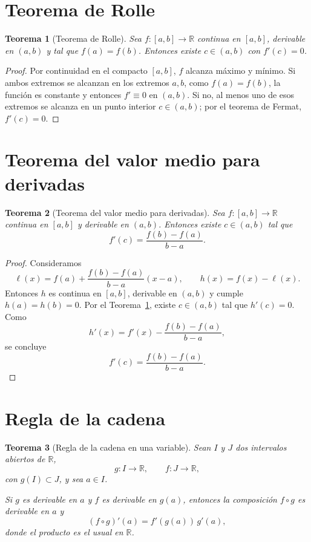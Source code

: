 \documentclass[a4paper,11pt]{report}
\newtheorem{theorem}{Teorema}[chapter]
\begin{document}
\section{Teorema de Rolle}

\begin{theorem}[Teorema de Rolle]\label{thm:rolle}
Sea $f:[a,b]\to\mathbb{R}$ continua en $[a,b]$, derivable en $(a,b)$ y tal que $f(a)=f(b)$. Entonces existe $c\in(a,b)$ con $f'(c)=0$.
\end{theorem}

\begin{proof}
Por continuidad en el compacto $[a,b]$, $f$ alcanza máximo y mínimo. Si ambos extremos se alcanzan en los extremos $a,b$, como $f(a)=f(b)$, la función es constante y entonces $f'\equiv 0$ en $(a,b)$. Si no, al menos uno de esos extremos se alcanza en un punto interior $c\in(a,b)$; por el teorema de Fermat, $f'(c)=0$.
\end{proof}

\section{Teorema del valor medio para derivadas}

\begin{theorem}[Teorema del valor medio para derivadas]\label{thm:valor_medio_derivadas}
Sea $f:[a,b]\to\mathbb{R}$ continua en $[a,b]$ y derivable en $(a,b)$. Entonces existe $c\in(a,b)$ tal que
\[
f'(c)=\frac{f(b)-f(a)}{b-a}.
\]
\end{theorem}

\begin{proof}
Consideramos
\[
\ell(x)=f(a)+\frac{f(b)-f(a)}{b-a}(x-a),
\qquad
h(x)=f(x)-\ell(x).
\]
Entonces $h$ es continua en $[a,b]$, derivable en $(a,b)$ y cumple $h(a)=h(b)=0$. Por el Teorema~\ref{thm:rolle}, existe $c\in(a,b)$ tal que $h'(c)=0$. Como
\[
h'(x)=f'(x)-\frac{f(b)-f(a)}{b-a},
\]
se concluye
\[
f'(c)=\frac{f(b)-f(a)}{b-a}.
\]
\end{proof}

\section{Regla de la cadena}

\begin{theorem}[Regla de la cadena en una variable]\label{thm:regla_cadena_appendix}
Sean $I$ y $J$ dos intervalos abiertos de $\mathbb R$,
\[
g:I\to\mathbb R,\qquad f:J\to\mathbb R,
\]
con $g(I)\subset J$, y sea $a\in I$.

Si $g$ es derivable en $a$ y $f$ es derivable en $g(a)$, entonces la composición $f\circ g$ es derivable en $a$ y
\[
(f\circ g)'(a)=f'(g(a))\,g'(a),
\]
donde el producto es el usual en $\mathbb R$.
\end{theorem}
\end{document}
